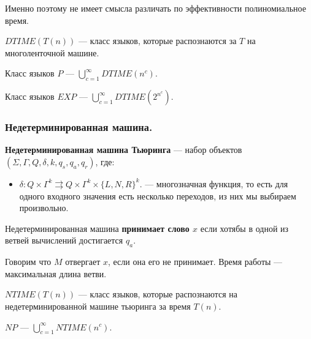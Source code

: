 \begin{note}
    Именно поэтому не имеет смысла различать по эффективности полиномиальное время. 
\end{note}

\begin{Def}
    $DTIME(T(n))$ ---  класс языков, которые распознаются за $T$ на многоленточной машине.
\end{Def}

\begin{Def}
    Класс языков $P$ ---  $\bigcup \limits_{c = 1}^{\infty} DTIME(n^c)$.
\end{Def}

\begin{Def}
    Класс языков $EXP$ ---  $\bigcup \limits_{c = 1}^{\infty} DTIME(2^{n^c})$.
\end{Def}

\subsubsection{Недетерминированная машина.}
\begin{Def}
    \textbf{Недетерминированная машина Тьюринга} --- набор объектов $(\Sigma, \Gamma, Q, \delta, k, q_s, q_a, q_r)$, где:
    \begin{itemize}
        \item $\delta: Q \times \Gamma ^ k \rightrightarrows Q \times \Gamma ^k \times \{L, N, R\} ^ k$. --- многозначная функция, 
            то есть для одного входного значения есть несколько переходов, из них мы выбираем произвольно. 
    \end{itemize}
\end{Def}

\begin{Def}
   Недетерминированная машина \textbf{принимает слово $x$} если хотябы в одной из ветвей вычислений достигается $q_a$. 
\end{Def}
\begin{Def}
   Говорим что $M$ отвергает  $x$, если она его не принимает. 
   Время работы --- максимальная длина ветви.
\end{Def}

\begin{Def}
    $NTIME(T(n))$ --- класс языков, которые распознаются на недетерминированной машине тьюринга за время  $T(n)$.
\end{Def}

\begin{Def}
    $NP$ --- $\bigcup \limits_{c = 1}^{\infty} NTIME(n^c)$.
\end{Def}

